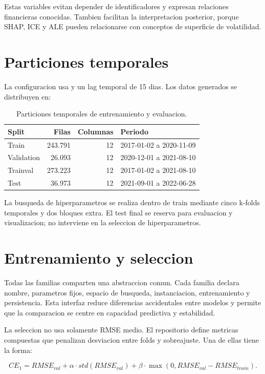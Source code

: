 Estas variables evitan depender de identificadores y expresan relaciones financieras conocidas. Tambien facilitan la interpretacion posterior, porque SHAP, ICE y ALE pueden relacionarse con conceptos de superficie de volatilidad.

\section{Particiones temporales}

La configuracion usa  y un lag temporal de 15 dias. Los datos generados se distribuyen en:

\begin{table}[h]
\centering
\begin{tabular}{lrrl}
\toprule
Split & Filas & Columnas & Periodo \\
\midrule
Train & 243.791 & 12 & 2017-01-02 a 2020-11-09 \\
Validation & 26.093 & 12 & 2020-12-01 a 2021-08-10 \\
Trainval & 273.223 & 12 & 2017-01-02 a 2021-08-10 \\
Test & 36.973 & 12 & 2021-09-01 a 2022-06-28 \\
\bottomrule
\end{tabular}
\caption{Particiones temporales de entrenamiento y evaluacion.}
\end{table}

La busqueda de hiperparametros se realiza dentro de train mediante cinco k-folds temporales y dos bloques extra. El test final se reserva para evaluacion y visualizacion; no interviene en la seleccion de hiperparametros.

\section{Entrenamiento y seleccion}

Todas las familias comparten una abstraccion comun. Cada familia declara nombre, parametros fijos, espacio de busqueda, instanciacion, entrenamiento y persistencia. Esta interfaz reduce diferencias accidentales entre modelos y permite que la comparacion se centre en capacidad predictiva y estabilidad.

La seleccion no usa solamente RMSE medio. El repositorio define metricas compuestas que penalizan desviacion entre folds y sobreajuste. Una de ellas tiene la forma:

\[
CE_1=RMSE_{val}+\alpha \cdot std(RMSE_{val})+\beta \cdot \max(0,RMSE_{val}-RMSE_{train}).
\]

